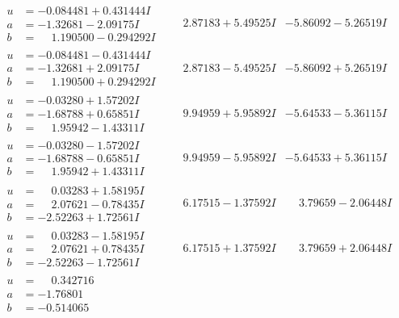 \documentclass[1p]{elsarticle_modified}
\theoremstyle{definition}
\begin{document}
$$\begin{array}{c|c|c}
\begin{aligned}
u &= -0.084481 + 0.431444 I \\
a &= -1.32681 - 2.09175 I \\
b &= \phantom{-}1.190500 - 0.294292 I\end{aligned}
 & \phantom{-}2.87183 + 5.49525 I & -5.86092 - 5.26519 I \\ \hline\begin{aligned}
u &= -0.084481 - 0.431444 I \\
a &= -1.32681 + 2.09175 I \\
b &= \phantom{-}1.190500 + 0.294292 I\end{aligned}
 & \phantom{-}2.87183 - 5.49525 I & -5.86092 + 5.26519 I \\ \hline\begin{aligned}
u &= -0.03280 + 1.57202 I \\
a &= -1.68788 + 0.65851 I \\
b &= \phantom{-}1.95942 - 1.43311 I\end{aligned}
 & \phantom{-}9.94959 + 5.95892 I & -5.64533 - 5.36115 I \\ \hline\begin{aligned}
u &= -0.03280 - 1.57202 I \\
a &= -1.68788 - 0.65851 I \\
b &= \phantom{-}1.95942 + 1.43311 I\end{aligned}
 & \phantom{-}9.94959 - 5.95892 I & -5.64533 + 5.36115 I \\ \hline\begin{aligned}
u &= \phantom{-}0.03283 + 1.58195 I \\
a &= \phantom{-}2.07621 - 0.78435 I \\
b &= -2.52263 + 1.72561 I\end{aligned}
 & \phantom{-}6.17515 - 1.37592 I & \phantom{-}3.79659 - 2.06448 I \\ \hline\begin{aligned}
u &= \phantom{-}0.03283 - 1.58195 I \\
a &= \phantom{-}2.07621 + 0.78435 I \\
b &= -2.52263 - 1.72561 I\end{aligned}
 & \phantom{-}6.17515 + 1.37592 I & \phantom{-}3.79659 + 2.06448 I \\ \hline\begin{aligned}
u &= \phantom{-}0.342716\phantom{ +0.000000I} \\
a &= -1.76801\phantom{ +0.000000I} \\
b &= -0.514065\phantom{ +0.000000I}\end{aligned}

\end{array}$$
\end{document}
